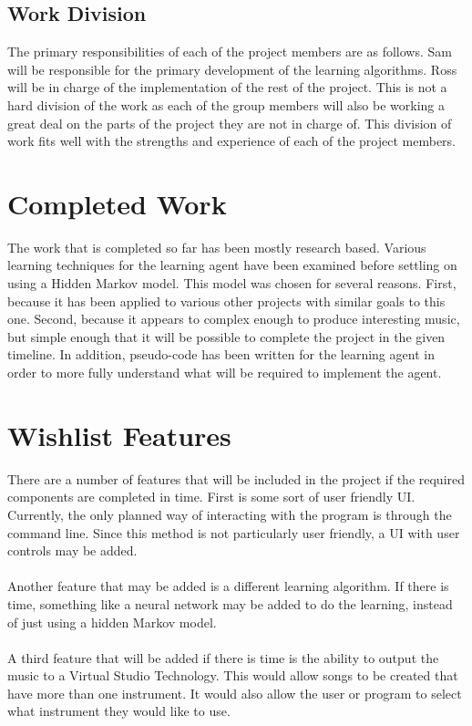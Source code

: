 \documentclass{article}
\begin{document}
\subsection{Work Division}
The primary responsibilities of each of the project members are as follows. Sam will be responsible for the primary development of the learning algorithms. Ross will be in charge of the implementation of the rest of the project. This is not a hard division of the work as each of the group members will also be working a great deal on the parts of the project they are not in charge of. This division of work fits well with the strengths and experience of each of the project members.

\section{Completed Work}
The work that is completed so far has been mostly research based. Various learning techniques for the learning agent have been examined before settling on using a Hidden Markov model. This model was chosen for several reasons. First, because it has been applied to various other projects with similar goals to this one. Second, because it appears to complex enough to produce interesting music, but simple enough that it will be possible to complete the project in the given timeline. In addition, pseudo-code has been written for the learning agent in order to more fully understand what will be required to implement the agent.

\section{Wishlist Features}
There are a number of features that will be included in the project if the required components are completed in time. First is some sort of user friendly UI. Currently, the only planned way of interacting with the program is through the command line. Since this method is not particularly user friendly, a UI with user controls may be added.\\
\\
Another feature that may be added is a different learning algorithm. If there is time, something like a neural network may be added to do the learning, instead of just using a hidden Markov model.\\
\\
A third feature that will be added if there is time is the ability to output the music to a Virtual Studio Technology. This would allow songs to be created that have more than one instrument. It would also allow the user or program to select what instrument they would like to use.

\nocite{*}




\newpage


\end{document}
